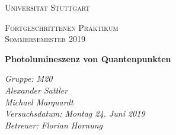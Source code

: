 \documentclass[aps,amsmath,amssymb,amsfont]{scrartcl}
\numberwithin{equation}{section}
\begin{document}
	\begin{titlepage}
	\centering
	\par\vspace{1cm}
	{\scshape\LARGE Universität Stuttgart \par}
	\vspace{1cm}
	{\scshape\Large  Fortgeschrittenen Praktikum \\ Sommersemester 2019\par}
	\vspace{1.5cm}
	{\huge\bfseries Photolumineszenz von Quantenpunkten\par}
	\vspace{2cm}
	{\Large\itshape Gruppe: M20\\ Alexander Sattler  \\  Michael Marquardt    \\ Versuchsdatum: Montag 24. Juni 2019\\ Betreuer: Florian Hornung\\ \par}
	\end{titlepage}


\tableofcontents
\newpage





\printbibliography

\end{document}
